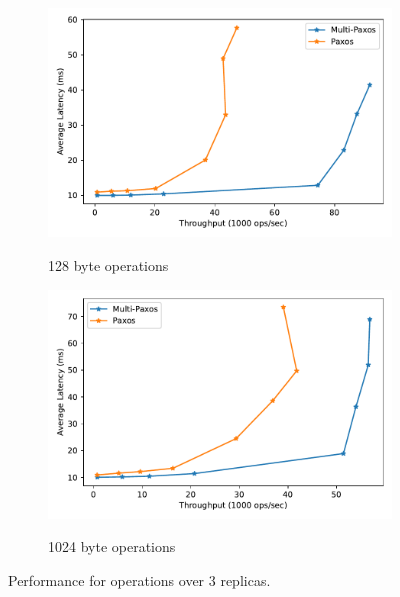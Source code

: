 \documentclass[sigconf]{acmart}
\begin{document}
\begin{figure}[htp]
    
\begin{subfigure}{\linewidth}
    \centering
    \caption{128 byte operations}
    \includegraphics[width=\textwidth]{3R_128B.pdf}
    \label{fig:3replicas-128}
\end{subfigure}

\begin{subfigure}{\linewidth}
    \centering
    \caption{1024 byte operations}
    \includegraphics[width=\textwidth]{3R_1024B.pdf}
    \label{fig:3replicas-1024}
\end{subfigure}

\caption{Performance for operations over 3 replicas.}
\label{fig:3replicas}

\end{figure}
\end{document}
